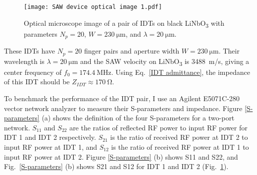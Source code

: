 \documentclass[double,12pt,1in,seploa]{beavtex}
\begin{document}

\begin{figure}
    \texttt{[image: SAW device optical image 1.pdf]}
    \caption{Optical microscope image of a pair of IDTs on black LiNbO\textsubscript{3} with parameters $N_p = 20$, $W = \SI{230}{\micro\meter}$, and $\lambda = \SI{20}{\micro\meter}$.}
    \label{SAW device optical image with measurements}
\end{figure}
These IDTs have $N_p = 20$ finger pairs and aperture width $W = \SI{230}{\micro\meter}$. Their wavelength is $\lambda = \SI{20}{\micro\meter}$ and the SAW velocity on LiNbO\textsubscript{3} is \SI{3488}{\meter/\second}, giving a center frequency of $f_0 = \SI{174.4}{\mega\hertz}$. Using Eq.\ \ref{IDT admittance}, the impedance of this IDT should be $Z_{IDT} \approx \SI{170}{\ohm}$. 

To benchmark the performance of the IDT pair, I use an Agilent E5071C-280 vector network analyzer to measure their S-parameters and impedance. Figure \ref{S-parameters} (a) shows the definition of the four S-parameters for a two-port network. $S_{11}$ and $S_{22}$ are the ratios of reflected RF power to input RF power for IDT 1 and IDT 2 respectively. $S_{21}$ is the ratio of received RF power at IDT 2 to input RF power at IDT 1, and $S_{12}$ is the ratio of received RF power at IDT 1 to input RF power at IDT 2. Figure \ref{S-parameters} (b) shows S11 and S22, and Fig.\ \ref{S-parameters} (b) shows S21 and S12 for IDT 1 and IDT 2 (Fig.\ \ref{SAW device optical image with measurements}).
\end{document}
